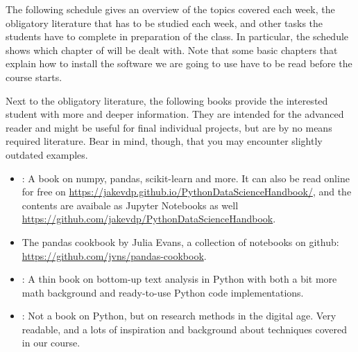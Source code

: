 The following schedule gives an overview of the topics covered each week, the obligatory literature that has to be studied each week, and other tasks the students have to complete in preparation of the class.
In particular, the schedule shows which chapter of \cite{cssbook} will be dealt with. Note that some basic chapters that explain how to install the software we are going to use have to be read before the course starts.

Next to the obligatory literature, the following books provide the interested student with more and deeper information. They are intended for the advanced reader and might be useful for final individual projects, but are by no means required literature. Bear in mind, though, that you may encounter slightly outdated examples.

\begin{itemize}
\item \citealp{VanderPlas2016}: A book on numpy, pandas, scikit-learn and more. It can also be read online for free on \url{https://jakevdp.github.io/PythonDataScienceHandbook/}, and the contents are avaibale as Jupyter Notebooks as well \url{https://github.com/jakevdp/PythonDataScienceHandbook}.
\item The pandas cookbook by Julia Evans, a collection of notebooks on github: \url{https://github.com/jvns/pandas-cookbook}.
\item \citealp{Hovy2020}: A thin book on bottom-up text analysis in Python with both a bit more math background and ready-to-use Python code implementations.
\item \citealp{Salganik2017}: Not a book on Python, but on research methods in the digital age. Very readable, and a lots of inspiration and background about techniques covered in our course.
\end{itemize}
